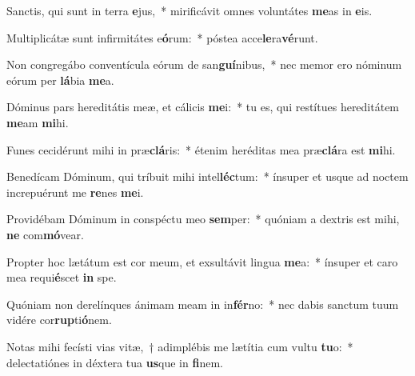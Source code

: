 \item Sanctis, qui sunt in terra \textbf{e}jus,~* mirificávit omnes voluntátes \textbf{me}as in \textbf{e}is.
\item Multiplicátæ sunt infirmitátes e\textbf{ó}rum:~* póstea acce\textbf{le}ra\textbf{vé}runt.
\item Non congregábo conventícula eórum de san\textbf{guí}nibus,~* nec memor ero nóminum eórum per \textbf{lá}bia \textbf{me}a.
\item Dóminus pars hereditátis meæ, et cálicis \textbf{me}i:~* tu es, qui restítues hereditátem \textbf{me}am \textbf{mi}hi.
\item Funes cecidérunt mihi in præ\textbf{clá}ris:~* étenim heréditas mea præ\textbf{clá}ra est \textbf{mi}hi.
\item Benedícam Dóminum, qui tríbuit mihi intel\textbf{léc}tum:~* ínsuper et usque ad noctem increpuérunt me \textbf{re}nes \textbf{me}i.
\item Providébam Dóminum in conspéctu meo \textbf{sem}per:~* quóniam a dextris est mihi, \textbf{ne} com\textbf{mó}vear.
\item Propter hoc lætátum est cor meum, et exsultávit lingua \textbf{me}a:~* ínsuper et caro mea requi\textbf{é}scet \textbf{in} spe.
\item Quóniam non derelínques ánimam meam in in\textbf{fér}no:~* nec dabis sanctum tuum vidére cor\textbf{rup}ti\textbf{ó}nem.
\item Notas mihi fecísti vias vitæ,~† adimplébis me lætítia cum vultu \textbf{tu}o:~* delectatiónes in déxtera tua \textbf{us}que in \textbf{fi}nem.
